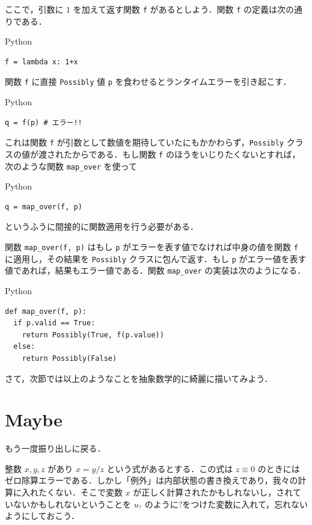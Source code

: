 \documentclass[a5paper,twoside,fleqn,draft]{jsbook}
\newcommand{\programminglanguage}[1]{\textsf{#1}}
\newcommand{\python}{\programminglanguage{Python}}
\newcommand{\code}[1]{\texttt{#1}}
\newenvironment{pythoncode}{\begin{itembox}[r]{\python}}{\end{itembox}}
\newcommand{\mMaybe}[1]{{#1}_?}
\begin{document}
ここで，引数に $1$ を加えて返す関数 \code{f} があるとしよう．関数 \code{f} の定義は次の通りである．
\begin{pythoncode}
\begin{verbatim}
f = lambda x: 1+x
\end{verbatim}
\end{pythoncode}

関数 \code{f} に直接 \code{Possibly} 値 \code{p} を食わせるとランタイムエラーを引き起こす．
\begin{pythoncode}
\begin{verbatim}
q = f(p) # エラー!!
\end{verbatim}
\end{pythoncode}
これは関数 \code{f} が引数として数値を期待していたにもかかわらず，\code{Possibly} クラスの値が渡されたからである．もし関数 \code{f} のほうをいじりたくないとすれば，次のような関数 \code{map\_over} を使って
\begin{pythoncode}
\begin{verbatim}
q = map_over(f, p)
\end{verbatim}
\end{pythoncode}
というふうに間接的に関数適用を行う必要がある．

関数 \code{map\_over(f, p)} はもし \code{p} がエラーを表す値でなければ中身の値を関数 \code{f} に適用し，その結果を \code{Possibly} クラスに包んで返す．もし \code{p} がエラー値を表す値であれば，結果もエラー値である．関数 \code{map\_over} の実装は次のようになる．
\begin{pythoncode}
\begin{verbatim}
def map_over(f, p):
  if p.valid == True:
    return Possibly(True, f(p.value))
  else:
    return Possibly(False)
\end{verbatim}
\end{pythoncode}

さて，次節では以上のようなことを抽象数学的に綺麗に描いてみよう．

\section{Maybe}

もう一度振り出しに戻る．

整数 $x,y,z$ があり $x=y/z$ という式があるとする．この式は $z\equiv0$ のときにはゼロ除算エラーである．しかし「例外」は内部状態の書き換えであり，我々の計算に入れたくない．そこで変数 $x$ が正しく計算されたかもしれないし，されていないかもしれないということを $\mMaybe{u}$ のように?をつけた変数に入れて，忘れないようにしておこう．
\end{document}
